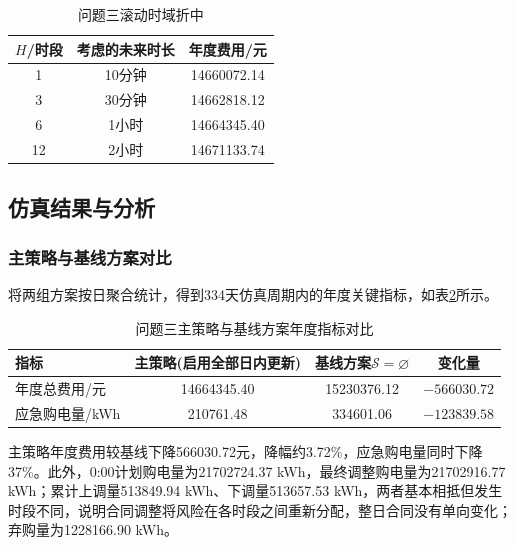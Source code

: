\begin{table}[htbp]
\centering
\caption{问题三滚动时域折中}
\label{tab:q3_H}
\begin{tabular}{ccc}
\hline
$H$/时段 & 考虑的未来时长 & 年度费用/元 \\
\hline
1 & 10分钟 & 14660072.14 \\
3 & 30分钟 & 14662818.12 \\
6 & 1小时 & 14664345.40 \\
12 & 2小时 & 14671133.74 \\
\hline
\end{tabular}
\end{table}

\subsection{仿真结果与分析}
\subsubsection{主策略与基线方案对比}
将两组方案按日聚合统计，得到334天仿真周期内的年度关键指标，如表\ref{tab:q3_compare}所示。
\begin{table}[htbp]
\centering
\caption{问题三主策略与基线方案年度指标对比}
\label{tab:q3_compare}
\begin{tabular}{lccc}
\hline
指标 & 主策略(启用全部日内更新) & 基线方案$\mathcal{S}=\varnothing$ & 变化量 \\
\hline
年度总费用/元 & 14664345.40 & 15230376.12 & $-566030.72$ \\
应急购电量/kWh & 210761.48 & 334601.06 & $-123839.58$ \\
\hline
\end{tabular}
\end{table}
主策略年度费用较基线下降566030.72元，降幅约3.72\%，应急购电量同时下降37\%。此外，0:00计划购电量为21702724.37 kWh，最终调整购电量为21702916.77 kWh；累计上调量513849.94 kWh、下调量513657.53 kWh，两者基本相抵但发生时段不同，说明合同调整将风险在各时段之间重新分配，整日合同没有单向变化；弃购量为1228166.90 kWh。

